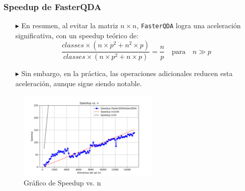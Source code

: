 \documentclass{beamer}
\begin{document}
\begin{frame}[fragile]
    \frametitle{Speedup de FasterQDA}
\scriptsize
    \begin{itemize}
        \item[$\blacktriangleright$]  En resumen, al evitar la matriz \(n \times n\), \texttt{FasterQDA} logra una aceleración significativa, con un speedup teórico de:
        \[
            \frac{classes \times (n \times p^2 + n^2 \times p)}{classes \times (n \times p^2 + n \times p)} = \frac{n}{p} \quad \text{para} \quad n \gg p
        \]
        \item[$\blacktriangleright$]  Sin embargo, en la práctica, las operaciones adicionales reducen esta aceleración, aunque sigue siendo notable.
    \end{itemize}
    \begin{figure}
        \centering
        \includegraphics[width=0.6\textwidth]{../speedup_vs_n.png} %
        \caption{Gráfico de Speedup vs. n}
    \end{figure}
\end{frame}
\end{document}

